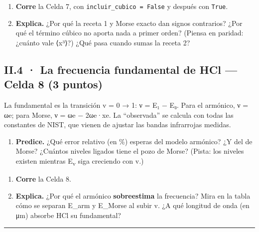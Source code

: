 
\begin{enumerate}
\def\labelenumi{\alph{enumi})}
\setcounter{enumi}{1}
\item
  \textbf{Corre} la Celda 7, con \texttt{incluir\_cubico\ =\ False} y después con \texttt{True}.
\item
  \textbf{Explica.} ¿Por qué la receta 1 y Morse exacto dan signos contrarios? ¿Por qué el término cúbico no aporta nada a primer orden? (Piensa en paridad: ¿cuánto vale ⟨x³⟩?) ¿Qué pasa cuando sumas la receta 2?
\end{enumerate}



\subsection{II.4 · La frecuencia fundamental de HCl --- Celda 8 (3 puntos)}

La fundamental es la transición v = 0 → 1: ν = E₁ − E₀. Para el armónico, ν = ωe; para Morse, ν = ωe − 2ωe·xe. La ``observada'' se calcula con todas las constantes de NIST, que vienen de ajustar las bandas infrarrojas medidas.

\begin{enumerate}
\def\labelenumi{\alph{enumi})}
\tightlist
\item
  \textbf{Predice.} ¿Qué error relativo (en \%) esperas del modelo armónico? ¿Y del de Morse? ¿Cuántos niveles ligados tiene el pozo de Morse? (Pista: los niveles existen mientras E\textsubscript{v} siga creciendo con v.)
\end{enumerate}


\begin{enumerate}
\def\labelenumi{\alph{enumi})}
\setcounter{enumi}{1}
\item
  \textbf{Corre} la Celda 8.
\item
  \textbf{Explica.} ¿Por qué el armónico \textbf{sobreestima} la frecuencia? Mira en la tabla cómo se separan E\_arm y E\_Morse al subir v. ¿A qué longitud de onda (en μm) absorbe HCl su fundamental?
\end{enumerate}



\begin{center}\rule{0.5\linewidth}{0.5pt}\end{center}

